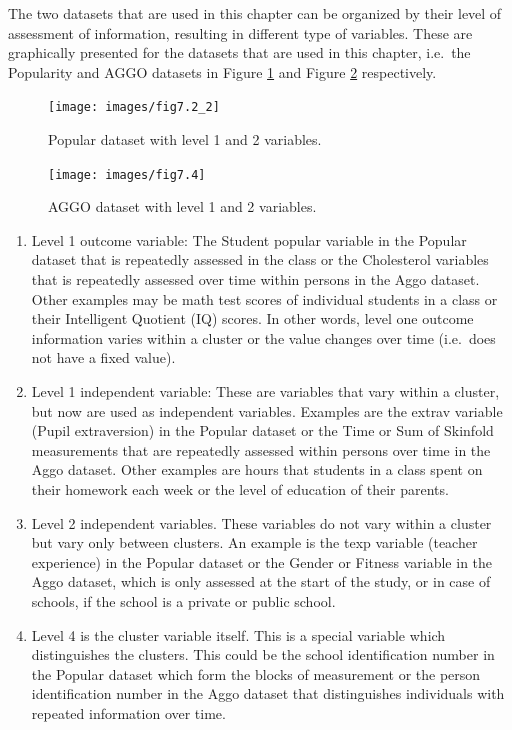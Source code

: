 \documentclass[
]{book}
\begin{document}
The two datasets that are used in this chapter can be organized by their level of assessment of information, resulting in different type of variables. These are graphically presented for the datasets that are used in this chapter, i.e.~the Popularity and AGGO datasets in Figure \ref{fig:fig72} and Figure \ref{fig:fig73} respectively.

\begin{figure}

{\centering \texttt{[image: images/fig7.2\_2]} 

}

\caption{Popular dataset with level 1 and 2 variables.}\label{fig:fig72}
\end{figure}

\begin{figure}

{\centering \texttt{[image: images/fig7.4]} 

}

\caption{AGGO dataset with level 1 and 2 variables.}\label{fig:fig73}
\end{figure}

\begin{enumerate}
\def\labelenumi{\arabic{enumi})}
\item
  Level 1 outcome variable: The Student popular variable in the Popular dataset that is repeatedly assessed in the class or the Cholesterol variables that is repeatedly assessed over time within persons in the Aggo dataset. Other examples may be math test scores of individual students in a class or their Intelligent Quotient (IQ) scores. In other words, level one outcome information varies within a cluster or the value changes over time (i.e.~does not have a fixed value).
\item
  Level 1 independent variable: These are variables that vary within a cluster, but now are used as independent variables. Examples are the extrav variable (Pupil extraversion) in the Popular dataset or the Time or Sum of Skinfold measurements that are repeatedly assessed within persons over time in the Aggo dataset. Other examples are hours that students in a class spent on their homework each week or the level of education of their parents.
\item
  Level 2 independent variables. These variables do not vary within a cluster but vary only between clusters. An example is the texp variable (teacher experience) in the Popular dataset or the Gender or Fitness variable in the Aggo dataset, which is only assessed at the start of the study, or in case of schools, if the school is a private or public school.
\item
  Level 4 is the cluster variable itself. This is a special variable which distinguishes the clusters. This could be the school identification number in the Popular dataset which form the blocks of measurement or the person identification number in the Aggo dataset that distinguishes individuals with repeated information over time.
\end{enumerate}
\end{document}
